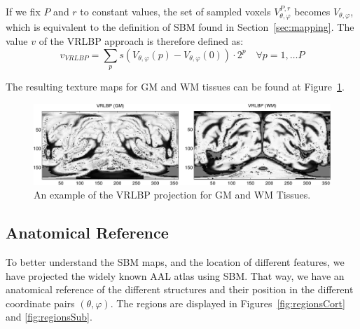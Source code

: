 If we fix $P$ and $r$ to constant values, the set of sampled voxels $V_{\theta,\varphi}^{P,r}$ becomes $V_{\theta,\varphi}$, which is equivalent to the definition of \ac{SBM} found in Section~\ref{sec:mapping}. The value $v$ of the \ac{VRLBP} approach is therefore defined as: 
\begin{equation}
v_{VRLBP} = \sum_{p} s(V_{\theta,\varphi}(p)-V_{\theta,\varphi}(0))\cdot 2^{p} \quad \forall p=1,\dots P
\end{equation}

The resulting texture maps for \ac{GM} and \ac{WM} tissues can be found at Figure~\ref{fig:vrlbp}. 

\begin{figure}[htp]
	\myfloatalign
	\includegraphics[width=\textwidth]{Graphics/ch6/04-vrlbp}
	\caption{An example of the \acs{VRLBP} projection for \acs{GM} and \acs{WM} Tissues. }
	\label{fig:vrlbp}
\end{figure}

%	
%	

\subsection{Anatomical Reference}\label{sec:anatomical}
To better understand the \ac{SBM} maps, and the location of different features, we have projected the widely known \ac{AAL} atlas \cite{Tzourio-Mazoyer2002} using \ac{SBM}. That way, we have an anatomical reference of the different structures and their position in the different coordinate pairs $(\theta,\varphi)$. The regions are displayed in  Figures~\ref{fig:regionsCort} and \ref{fig:regionsSub}. 

